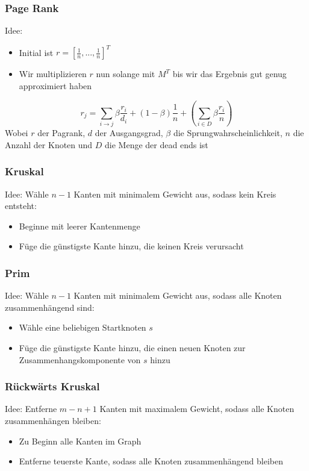 \documentclass[a4paper]{article}
\begin{document}
	\subsubsection{Page Rank}
	Idee: 
	\begin{itemize}
	  \item Initial ist $r=[\frac{1}{n},...,\frac{1}{n}]^T$
	  \item Wir multiplizieren $r$ nun solange mit $M^T$ bis wir das Ergebnis gut genug approximiert haben
	\end{itemize}
	$$
		r_j=\displaystyle\sum_{i\to j}\beta\frac{r_i}{d_i}+(1-\beta)\frac{1}{n}+(\displaystyle\sum_{i\in D}\beta\frac{r_i}{n})
	$$
	Wobei $r$ der Pagrank, $d$ der Ausgangsgrad, $\beta$ die Sprungwahrscheinlichkeit, $n$ die Anzahl der Knoten und $D$ die Menge der dead ends ist
	\subsubsection{Kruskal}
	Idee: Wähle $n-1$ Kanten mit minimalem Gewicht aus, sodass kein Kreis entsteht:
	\begin{itemize}
	  \item Beginne mit leerer Kantenmenge
	  \item Füge die günstigste Kante hinzu, die keinen Kreis verursacht
	\end{itemize}
	\subsubsection{Prim}
	Idee: Wähle $n-1$ Kanten mit minimalem Gewicht aus, sodass alle Knoten zusammenhängend sind:
	\begin{itemize}
	  \item Wähle eine beliebigen Startknoten $s$
	  \item Füge die günstigste Kante hinzu, die einen neuen Knoten zur Zusammenhangskomponente von $s$ hinzu
	\end{itemize}
	\subsubsection{Rückwärts Kruskal}
	Idee: Entferne $m-n+1$ Kanten mit maximalem Gewicht, sodass alle Knoten zusammenhängen bleiben:
	\begin{itemize}
	  \item Zu Beginn alle Kanten im Graph
	  \item Entferne teuerste Kante, sodass alle Knoten zusammenhängend bleiben
	\end{itemize}
\end{document}

